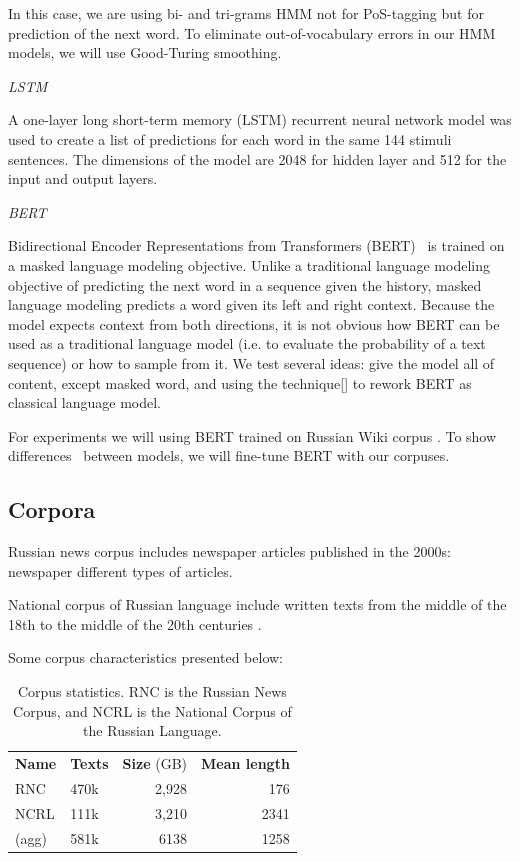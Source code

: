\documentclass[a4paper]{article}
\newcommand{\head}[1]{\vspace{0.5em}\emph{#1}\vspace{0.25em}}
\begin{document}
In this case, we are using bi- and tri-grams HMM not for PoS-tagging but for prediction of the next word. To eliminate out-of-vocabulary errors in our HMM models, we will use Good-Turing smoothing.

\head{LSTM}

A one-layer long short-term memory (LSTM) recurrent neural network model was used
\cite{jozefowicz:2016}
to create a list of predictions for each word in the same 144 stimuli sentences. The dimensions of the model are 2048 for hidden layer and 512 for the input and output layers. 

\head{BERT}

Bidirectional Encoder Representations from Transformers
(BERT) \cite{bert} is trained on a masked language modeling objective. Unlike a traditional language modeling objective of predicting the next word in a sequence given the history, masked language modeling predicts a word given its left and right context. Because the model expects context from both directions, it is not obvious how BERT can be used as a traditional language model (i.e. to evaluate the probability of a text sequence) or how to sample from it. We test several ideas: give the model all of content, except masked word, and using the technique[] to rework BERT as classical language model.


For experiments we will using BERT trained on Russian Wiki corpus
\cite{ruwiki}. To show differences  between models, we will fine-tune BERT with our corpuses.



\subsection{Corpora}

Russian news corpus \cite{runews} includes newspaper articles published in the 2000s: newspaper different types of articles.
 

National corpus of Russian language \cite{natcorp} include written texts from the middle of the 18th to the middle of the 20th centuries
.

Some corpus characteristics presented below:

\begin{table}
\caption{Corpus statistics. RNC is the Russian News Corpus, and NCRL
is the National Corpus of the Russian Language.}
\centering

\begin{tabular}{llrr}
\textbf{Name}&
\textbf{Texts} &
\textbf{Size} (GB)&
\textbf{Mean length}\\
RNC &
470k&
2,928&
176\\
NCRL &
111k &
3,210 &
2341 \\
(agg) &
581k &
6138 &
1258
\end{tabular}
\end{table}
\end{document}
